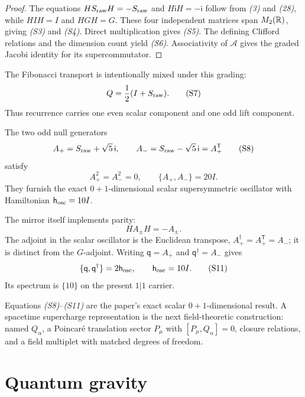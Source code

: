 \begin{proof}
The equations $H S_{\rm raw}H=-S_{\rm raw}$ and
$H\mathsf iH=-\mathsf i$ follow from \emph{(3)} and \emph{(28)}, while
$HIH=I$ and $HGH=G$.  These four independent matrices span $M_2(\mathbb R)$,
giving \emph{(S3)} and \emph{(S4)}.  Direct multiplication gives
\emph{(S5)}.  The defining Clifford relations and the dimension count yield
\emph{(S6)}.  Associativity of $\mathcal A$ gives the graded Jacobi identity
for its supercommutator.
\end{proof}

The Fibonacci transport is intentionally mixed under this grading:
\[
Q=\frac12(I+S_{\rm raw}).
\tag{S7}
\]
Thus recurrence carries one even scalar component and one odd lift component.

\begin{proposition}
The two odd null generators
\[
A_+=S_{\rm raw}+\sqrt5\,\mathsf i,
\qquad
A_-=S_{\rm raw}-\sqrt5\,\mathsf i=A_+^{\mathsf T}
\tag{S8}
\]
satisfy
\[
A_+^2=A_-^2=0,
\qquad
\{A_+,A_-\}=20I.
\tag{S9}
\]
They furnish the exact $0+1$-dimensional scalar supersymmetric oscillator
with Hamiltonian $\mathsf h_{\rm osc}=10I$.
\end{proposition}

\begin{remark}
The mirror itself implements parity:
\[
HA_\pm H=-A_\pm.
\tag{S10}
\]
The adjoint in the scalar oscillator is the Euclidean transpose,
$A_+^\dagger=A_+^{\mathsf T}=A_-$; it is distinct from the $G$-adjoint.
Writing $\mathsf q=A_+$ and $\mathsf q^\dagger=A_-$ gives
\[
\{\mathsf q,\mathsf q^\dagger\}=2\mathsf h_{\rm osc},
\qquad \mathsf h_{\rm osc}=10I.
\tag{S11}
\]
Its spectrum is $\{10\}$ on the present $1|1$ carrier.
\end{remark}

Equations \emph{(S8)}--\emph{(S11)} are the paper's exact scalar
$0+1$-dimensional result.  A spacetime supercharge representation is the next
field-theoretic construction: named $Q_\alpha$, a Poincar\'e translation
sector $P_\mu$ with $[P_\mu,Q_\alpha]=0$, closure relations, and a field
multiplet with matched degrees of freedom.

\section{Quantum gravity}
\label{sec:qg}


